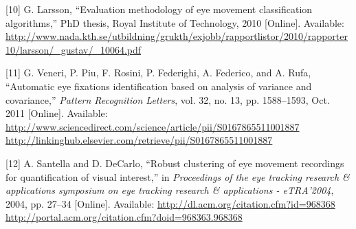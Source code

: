\documentclass[brazil,]{report}
\begin{document}
{[}10{]} G. Larsson, ``Evaluation methodology of eye movement
classification algorithms,'' PhD thesis, Royal Institute of Technology,
2010 {[}Online{]}. Available:
\url{http://www.nada.kth.se/utbildning/grukth/exjobb/rapportlistor/2010/rapporter10/larsson/_gustav/_10064.pdf}

{[}11{]} G. Veneri, P. Piu, F. Rosini, P. Federighi, A. Federico, and A.
Rufa, ``Automatic eye fixations identification based on analysis of
variance and covariance,'' \emph{Pattern Recognition Letters}, vol. 32,
no. 13, pp. 1588--1593, Oct. 2011 {[}Online{]}. Available:
\href{http://www.sciencedirect.com/science/article/pii/S0167865511001887 http://linkinghub.elsevier.com/retrieve/pii/S0167865511001887}{http://www.sciencedirect.com/science/article/pii/S0167865511001887
http://linkinghub.elsevier.com/retrieve/pii/S0167865511001887}

{[}12{]} A. Santella and D. DeCarlo, ``Robust clustering of eye movement
recordings for quantification of visual interest,'' in \emph{Proceedings
of the eye tracking research \& applications symposium on eye tracking
research \& applications - eTRA'2004}, 2004, pp. 27--34 {[}Online{]}.
Available:
\href{http://dl.acm.org/citation.cfm?id=968368 http://portal.acm.org/citation.cfm?doid=968363.968368}{http://dl.acm.org/citation.cfm?id=968368
http://portal.acm.org/citation.cfm?doid=968363.968368}
\end{document}
